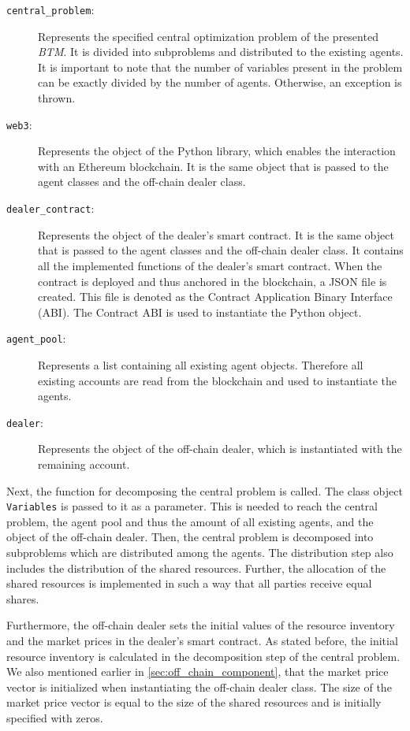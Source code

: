 \begin{description}
	\item[\texttt{central\_problem}:] Represents the specified central optimization problem of the presented \textit{BTM}.
    It is divided into subproblems and distributed to the existing agents. It is important 
    to note that the number of variables present in the problem can be exactly divided by the number of agents.
    Otherwise, an exception is thrown.
	\item[\texttt{web3}:] Represents the object of the Python library, which enables the interaction with an
	Ethereum blockchain. It is the same object that is passed to the agent classes and the off-chain dealer class.
    \item[\texttt{dealer\_contract}:] Represents the object of the dealer's smart contract. 
    It is the same object that is passed to the agent classes and the off-chain dealer class. It contains all the
    implemented functions of the dealer's smart contract. When the contract is deployed and thus anchored in the blockchain, a JSON file is created. 
    This file is denoted as the Contract Application Binary Interface (ABI). The Contract ABI is used to instantiate the Python object.  
    \item[\texttt{agent\_pool}:] Represents a list containing all existing agent objects. 
    Therefore all existing accounts are read from the blockchain and used to instantiate the agents.
    \item[\texttt{dealer}:] Represents the object of the off-chain dealer, which is instantiated with the 
    remaining account.
\end{description}

Next, the function for decomposing the central problem is called. The class object \verb|Variables| is passed to it as a parameter.
This is needed to reach the central problem, the agent pool and thus the amount of all existing agents, and the object of the
off-chain dealer. 
Then, the central problem is decomposed into subproblems which are distributed among the agents. 
The distribution step also includes the distribution of the shared resources. 
Further, the allocation of the shared resources is implemented in such a way that all parties receive equal shares.

Furthermore, the off-chain dealer sets the initial values of the resource inventory and the market prices in the dealer's
smart contract. As stated before, the initial resource inventory is calculated in the decomposition step of the central problem. 
We also mentioned earlier in \ref{sec:off_chain_component}, that the market price vector is initialized when instantiating the off-chain dealer class.
The size of the market price vector is equal to the size of the shared resources and is initially specified with zeros.

